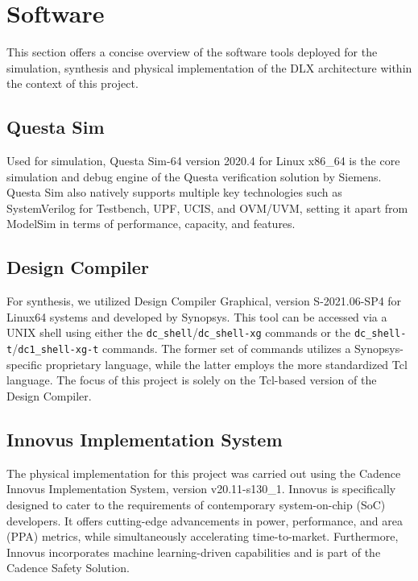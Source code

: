 \section{Software}
\label{sec:software}
This section offers a concise overview of the software tools deployed for the simulation, synthesis and physical implementation of the DLX architecture within the context of this project.

\subsection{Questa Sim}
Used for simulation, Questa Sim-64 version 2020.4 for Linux x86\_64 is the core simulation and debug engine of the Questa verification solution by Siemens. Questa Sim also natively supports multiple key technologies such as SystemVerilog for Testbench, UPF, UCIS, and OVM/UVM, setting it apart from ModelSim in terms of performance, capacity, and features.

\subsection{Design Compiler}
For synthesis, we utilized Design Compiler Graphical, version S-2021.06-SP4 for Linux64 systems and developed by Synopsys. This tool can be accessed via a UNIX shell using either the \texttt{dc\_shell}/\texttt{dc\_shell-xg} commands or the \texttt{dc\_shell-t}/\texttt{dc1\_shell-xg-t} commands. The former set of commands utilizes a Synopsys-specific proprietary language, while the latter employs the more standardized Tcl language. The focus of this project is solely on the Tcl-based version of the Design Compiler.

\subsection{Innovus Implementation System}
The physical implementation for this project was carried out using the Cadence Innovus Implementation System, version v20.11-s130\_1. Innovus is specifically designed to cater to the requirements of contemporary system-on-chip (SoC) developers. It offers cutting-edge advancements in power, performance, and area (PPA) metrics, while simultaneously accelerating time-to-market. Furthermore, Innovus incorporates machine learning-driven capabilities and is part of the Cadence Safety Solution.
